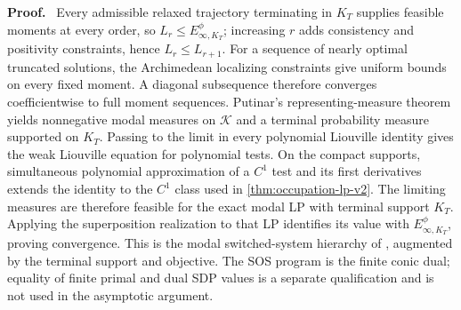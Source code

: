 \documentclass[twoside,11pt]{article}
\renewenvironment{proof}[1][Proof]{\par\noindent\textbf{#1.}\ }{\hfill\BlackBox\par\medskip}
\begin{document}
\begin{proof}
Every admissible relaxed trajectory terminating in $K_T$ supplies feasible
moments at every order, so $L_r\le E_{\infty,K_T}^\phi$; increasing $r$
adds consistency and positivity constraints, hence $L_r\le L_{r+1}$.  For a
sequence of nearly optimal truncated solutions, the Archimedean localizing
constraints give uniform bounds on every fixed moment.  A diagonal
subsequence therefore converges coefficientwise to full moment sequences.
Putinar's representing-measure theorem yields nonnegative modal measures on
$\mathcal K$ and a terminal probability measure supported on $K_T$.  Passing
to the limit in every polynomial Liouville identity gives the weak Liouville
equation for polynomial tests.  On the compact supports, simultaneous
polynomial approximation of a $C^1$ test and its first derivatives extends the
identity to the $C^1$ class used in \cref{thm:occupation-lp-v2}.  The limiting
measures are therefore feasible for the exact modal LP with terminal support
$K_T$.  Applying the superposition realization to that LP identifies its value
with $E_{\infty,K_T}^\phi$, proving convergence.  This is the modal
switched-system hierarchy of \citet[Theorem~5]{ClaeysDaafouzHenrion2016},
augmented by the terminal support and objective.  The SOS program is the
finite conic dual; equality of finite primal and dual SDP values is a separate
qualification and is not used in the asymptotic argument.
\end{proof}

\end{document}
